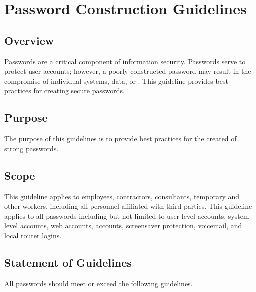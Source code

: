 \chapter{Password Construction Guidelines}\label{G:PCG}
\CommonIntroduction
\section{Overview}
Passwords are a critical component of information security.  
Passwords serve to protect user accounts; however, a poorly constructed password may result in the compromise of individual systems, data, or .  
This guideline provides best practices for creating secure passwords.
\section{Purpose}
The purpose of this guidelines is to provide best practices for the created of strong passwords.
\section{Scope}
This guideline applies to employees, contractors, consultants, temporary and other workers, including all personnel affiliated with third parties.  
This guideline applies to all passwords including but not limited to user-level accounts, system-level accounts, web accounts, \email{} accounts, screen\oldnew{ }{}saver protection, voicemail, and local router logins.
\section{Statement of Guidelines}
All passwords should meet or exceed the following guidelines.

